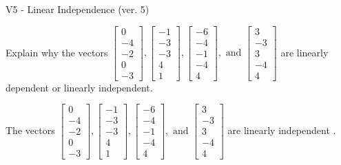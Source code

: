 \begin{exercise}
  \begin{exerciseTitle}V5 - Linear Independence (ver. 5)\end{exerciseTitle}
  \begin{exerciseStatement}
    Explain why the vectors \(\left[\begin{array}{r}
0 \\
-4 \\
-2 \\
0 \\
-3
\end{array}\right] , \left[\begin{array}{r}
-1 \\
-3 \\
-3 \\
4 \\
1
\end{array}\right] , \left[\begin{array}{r}
-6 \\
-4 \\
-1 \\
-4 \\
4
\end{array}\right] , \text{ and } \left[\begin{array}{r}
3 \\
-3 \\
3 \\
-4 \\
4
\end{array}\right]\) are linearly dependent or linearly independent.	


  \end{exerciseStatement}
  \begin{exerciseAnswer}
   The vectors \(\left[\begin{array}{r}
0 \\
-4 \\
-2 \\
0 \\
-3
\end{array}\right] , \left[\begin{array}{r}
-1 \\
-3 \\
-3 \\
4 \\
1
\end{array}\right] , \left[\begin{array}{r}
-6 \\
-4 \\
-1 \\
-4 \\
4
\end{array}\right] , \text{ and } \left[\begin{array}{r}
3 \\
-3 \\
3 \\
-4 \\
4
\end{array}\right]\) are 
  	 linearly independent  .
  


  \end{exerciseAnswer}
\end{exercise}